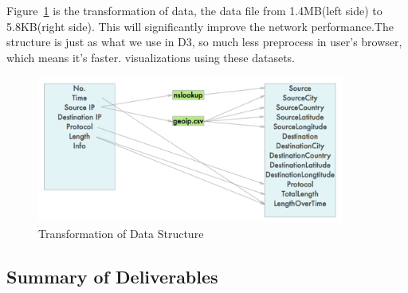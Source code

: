 \documentclass[paper=a4, fontsize=11pt]{report} %
\begin{document}
\begin{description}[style=nextline]
	\item[\href{http://sjengle.cs.usfca.edu/cs690-sonicwall/}{Transformation of Data}]
    Figure~\ref{fig:datastructure} is the transformation of data, the data file from 1.4MB(left side) to 5.8KB(right side). This will significantly improve the network performance.The structure is just as what we use in D3, so much less preprocess in user's browser, which means it's faster.
visualizations using these datasets.
	   \begin{figure}[H]
        \begin{center}
            \includegraphics[width=0.9\textwidth]{datastructure.png}
        \end{center}
        \caption{Transformation of Data Structure}\label{fig:datastructure}
    \end{figure}

\end{description}


\subsection{Summary of Deliverables} %
\label{sub:deliverable}
\end{document}
